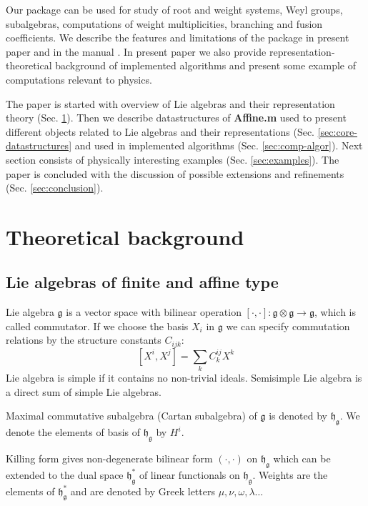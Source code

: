 \documentclass[preprint,12pt]{elsarticle}
\newcommand{\gf}{\mathfrak{g}}
\newcommand{\hf}{\mathfrak{h}}
\newcommand{\hfg}{\hf_{\gf}}
\begin{document}
Our package can be used for study of root and weight systems, Weyl groups, subalgebras, computations of weight multiplicities, branching and fusion coefficients. We describe the features and limitations of the package in present paper and in the manual \cite{affinemanual}. In present paper we also provide representation-theoretical background of implemented algorithms and present some example of computations relevant to physics. 

The paper is started with overview of Lie algebras and their representation theory (Sec. \ref{sec:theor-backgr}). Then we describe datastructures of {\bf Affine.m} used to present different objects related to Lie algebras and their representations (Sec. \ref{sec:core-datastructures} and used in implemented algorithms (Sec. \ref{sec:comp-algor}). Next section consists of physically interesting examples (Sec. \ref{sec:examples}). The paper is concluded with the discussion of possible extensions and refinements (Sec. \ref{sec:conclusion}).

\section{Theoretical background}
\label{sec:theor-backgr}

\subsection{Lie algebras of finite and affine type}
\label{sec:lie-algebras-finite}

Lie algebra $\gf$ is a vector space with bilinear operation $[\cdot,\cdot]:\gf\otimes\gf\to \gf$, which is called commutator. If we choose the basis $X_{i}$ in $\gf$ we can specify commutation relations by the structure constants $C_{ijk}$:
\begin{equation}
  \label{eq:1}
  [X^{i},X^{j}]=\sum_{k} C^{ij}_{k} X^{k}
\end{equation}
Lie algebra is simple if it contains no non-trivial ideals. Semisimple Lie algebra is a direct sum of simple Lie algebras. 

Maximal commutative subalgebra (Cartan subalgebra) of $\gf$ is denoted by $\hfg$.
We denote the elements of basis of $\hfg$ by $H^{i}$.

Killing form gives non-degenerate bilinear form $(\cdot,\cdot)$ on $\hfg$ which can be extended to the dual space $\hfg^{*}$ of linear functionals on $\hfg$. Weights are the elements of $\hfg^{*}$ and are denoted by Greek letters $\mu,\nu, \omega, \lambda\dots$   
\end{document}
